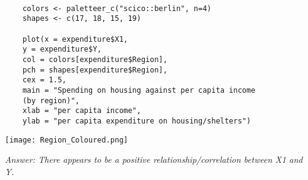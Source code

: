 \documentclass[12pt,letterpaper]{article}
\begin{document}
\begin{itemize}
\begin{verbatim}
	
	colors <- paletteer_c("scico::berlin", n=4)
	shapes <- c(17, 18, 15, 19)
	
	plot(x = expenditure$X1, 
	y = expenditure$Y,
	col = colors[expenditure$Region],
	pch = shapes[expenditure$Region], 
	cex = 1.5,
	main = "Spending on housing against per capita income
	(by region)",
	xlab = "per capita income", 
	ylab = "per capita expenditure on housing/shelters")

\end{verbatim}

\begin{center}
	\texttt{[image: Region\_Coloured.png]}
\end{center}


\textit{Answer: There appears to be a positive relationship/correlation between X1 and Y. 
}

\end{itemize}
\end{document}

